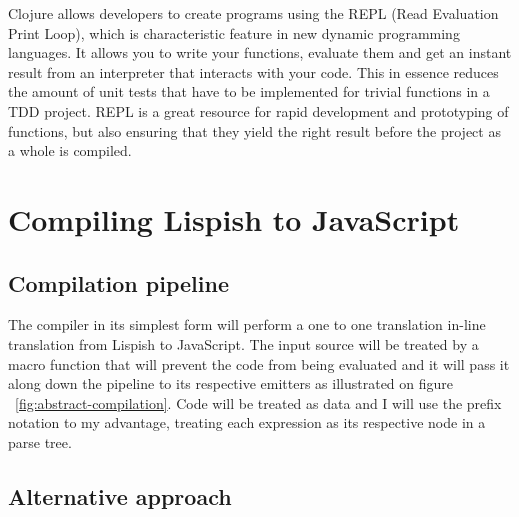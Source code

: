 Clojure allows developers to create programs using the REPL (Read Evaluation Print Loop), which is characteristic feature in new dynamic programming languages. It allows you to write your functions, evaluate them and get an instant result from an interpreter that interacts with your code. This in essence reduces the amount of unit tests that have to be implemented for trivial functions in a TDD project. 
REPL is a great resource for rapid development and prototyping of functions, but also ensuring that they yield the right result before the project as a whole is compiled.

\section{Compiling Lispish to JavaScript}

\subsection{Compilation pipeline}



The compiler in its simplest form will perform a one to one translation in-line translation from Lispish to JavaScript. 
The input source will be treated by a macro function that will prevent the code from being evaluated and it will pass it along down the pipeline to its respective emitters as illustrated on figure ~\ref{fig:abstract-compilation}. Code will be treated as data and I will use the prefix notation to my advantage, treating each expression as its respective node in a parse tree. 

\subsection{Alternative approach}
